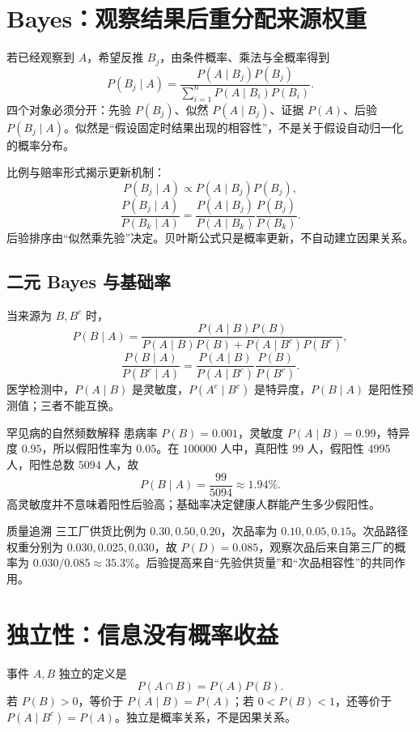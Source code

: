 \documentclass[11pt,a4paper]{ctexart}
\begin{document}
\section{Bayes：观察结果后重分配来源权重}

若已经观察到 $A$，希望反推 $B_j$，由条件概率、乘法与全概率得到
\[
\boxed{P(B_j\mid A)=\frac{P(A\mid B_j)P(B_j)}{\displaystyle\sum_{i=1}^{n}P(A\mid B_i)P(B_i)}}.
\]
四个对象必须分开：先验 $P(B_j)$、似然 $P(A\mid B_j)$、证据 $P(A)$、后验 $P(B_j\mid A)$。似然是“假设固定时结果出现的相容性”，不是关于假设自动归一化的概率分布。

比例与赔率形式揭示更新机制：
\[
P(B_j\mid A)\propto P(A\mid B_j)P(B_j),
\]
\[
\boxed{\frac{P(B_j\mid A)}{P(B_k\mid A)}=\frac{P(A\mid B_j)}{P(A\mid B_k)}\frac{P(B_j)}{P(B_k)}}.
\]
后验排序由“似然乘先验”决定。贝叶斯公式只是概率更新，不自动建立因果关系。

\subsection{二元 Bayes 与基础率}

当来源为 $B,B^c$ 时，
\[
P(B\mid A)=\frac{P(A\mid B)P(B)}{P(A\mid B)P(B)+P(A\mid B^c)P(B^c)},
\]
\[
\frac{P(B\mid A)}{P(B^c\mid A)}=\frac{P(A\mid B)}{P(A\mid B^c)}\frac{P(B)}{P(B^c)}.
\]
医学检测中，$P(A\mid B)$ 是灵敏度，$P(A^c\mid B^c)$ 是特异度，$P(B\mid A)$ 是阳性预测值；三者不能互换。

\begin{examplebox}{罕见病的自然频数解释}
患病率 $P(B)=0.001$，灵敏度 $P(A\mid B)=0.99$，特异度 $0.95$，所以假阳性率为 $0.05$。在 $100000$ 人中，真阳性 $99$ 人，假阳性 $4995$ 人，阳性总数 $5094$ 人，故
\[
P(B\mid A)=\frac{99}{5094}\approx1.94\%.
\]
高灵敏度并不意味着阳性后验高；基础率决定健康人群能产生多少假阳性。
\end{examplebox}

\begin{examplebox}{质量追溯}
三工厂供货比例为 $0.30,0.50,0.20$，次品率为 $0.10,0.05,0.15$。次品路径权重分别为 $0.030,0.025,0.030$，故 $P(D)=0.085$，观察次品后来自第三厂的概率为 $0.030/0.085\approx35.3\%$。后验提高来自“先验供货量”和“次品相容性”的共同作用。
\end{examplebox}

\section{独立性：信息没有概率收益}

事件 $A,B$ 独立的定义是
\[
\boxed{P(A\cap B)=P(A)P(B)}.
\]
若 $P(B)>0$，等价于 $P(A\mid B)=P(A)$；若 $0<P(B)<1$，还等价于 $P(A\mid B^c)=P(A)$。独立是概率关系，不是因果关系。
\end{document}
